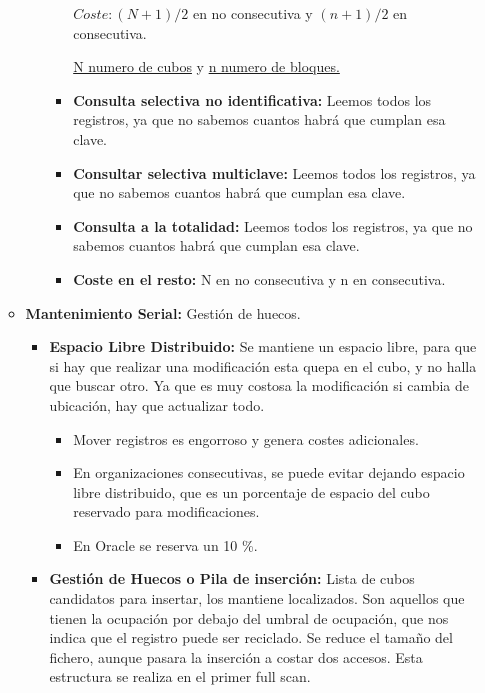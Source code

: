 \documentclass[12pt, twoside, openright]{report} %
\begin{document}
\begin{itemize}
\begin{itemize}
\begin{itemize}
\begin{itemize}
        
		  
            $Coste: (N+1)/2$ en no consecutiva y $(n+1)/2$ en consecutiva.
           
			
            \underline{N numero de cubos} y \underline{n numero de
            bloques.}
      
			
        \item \textbf{Consulta selectiva no identificativa:} Leemos todos
          los registros, ya que no sabemos cuantos habrá que cumplan esa
          clave.
          
        \item \textbf{Consultar selectiva multiclave:} Leemos todos los
          registros, ya que no sabemos cuantos habrá que cumplan esa
          clave.
          
        \item \textbf{Consulta a la totalidad:} Leemos todos los registros,
          ya que no sabemos cuantos habrá que cumplan esa clave.
          
        \item \textbf{Coste en el resto:} N en no consecutiva y n en
          consecutiva.
          
        \end{itemize}
      \end{itemize}
    \item \textbf{Mantenimiento Serial:} Gestión de huecos.
      

      \begin{itemize}
      \item \textbf{Espacio Libre Distribuido:} Se mantiene un espacio
        libre, para que si hay que realizar una modificación esta quepa
        en el cubo, y no halla que buscar otro. Ya que es muy costosa la
        modificación si cambia de ubicación, hay que actualizar todo.
        

        \begin{itemize}
        \item Mover registros es engorroso y genera costes adicionales.
          
        \item En organizaciones consecutivas, se puede evitar dejando
          espacio libre distribuido, que es un porcentaje de espacio del
          cubo reservado para modificaciones.
          
        \item En Oracle se reserva un 10 \%.
          
        \end{itemize}
      \item \textbf{Gestión de Huecos o Pila de inserción:} Lista de cubos
        candidatos para insertar, los mantiene localizados. Son aquellos
        que tienen la ocupación por debajo del umbral de ocupación, que
        nos indica que el registro puede ser reciclado. Se reduce el
        tamaño del fichero, aunque pasara la inserción a costar dos
        accesos. Esta estructura se realiza en el primer full scan.
        

\end{itemize}
\end{itemize}
\end{itemize}
\end{document}
